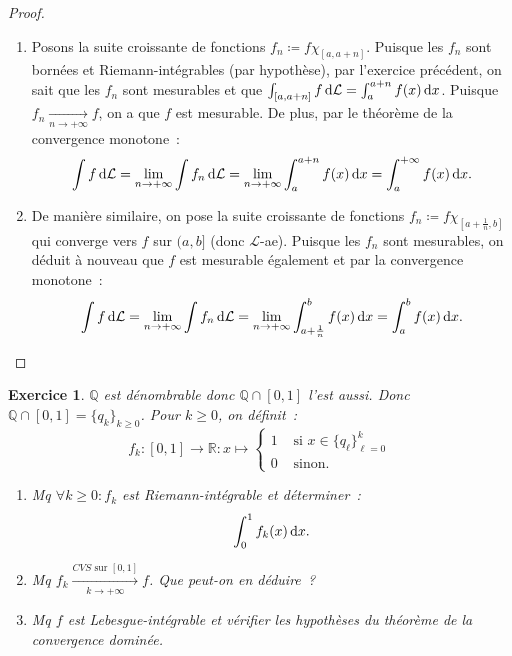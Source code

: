 \documentclass{article}
\newtheorem{ex}{Exercice}[section]
\newcommand{\pinfty}{{+\infty}}
\newcommand{\Q}{{\mathbb Q}}
\newcommand{\R}{{\mathbb R}}
\begin{document}
\begin{proof}~
\begin{enumerate}
	\item Posons la suite croissante de fonctions $f_n \coloneqq f\chi_{[a, a+n]}$. Puisque les $f_n$ sont bornées et Riemann-intégrables (par hypothèse), par l'exercice précédent,
	on sait que les $f_n$ sont mesurables et que $\int_{[a, a+n]}f\dif\mathcal L = \int_a^{a+n}f(x)\dif x$. Puisque $f_n \xrightarrow[n \to \pinfty]{} f$, on
	a que $f$ est mesurable. De plus, par le théorème de la convergence monotone~:
	\[\int f\dif\mathcal L = \lim_{n \to \pinfty}\int f_n\dif\mathcal L = \lim_{n \to \pinfty}\int_a^{a+n}f(x)\dif x = \int_a^\pinfty f(x)\dif x.\]

	\item De manière similaire, on pose la suite croissante de fonctions $f_n \coloneqq f\chi_{[a+\frac 1n, b]}$ qui converge vers $f$ sur $(a, b]$ (donc $\mathcal L$-ae).
	Puisque les $f_n$ sont mesurables, on déduit à nouveau que $f$ est mesurable également et par la convergence monotone~:
	\[\int f\dif\mathcal L = \lim_{n \to \pinfty}\int f_n\dif\mathcal L = \lim_{n \to \pinfty}\int_{a+\frac 1n}^bf(x)\dif x = \int_a^bf(x)\dif x.\]
\end{enumerate}
\end{proof}

\begin{ex} $\Q$ est dénombrable donc $\Q \cap [0, 1]$ l'est aussi. Donc $\Q \cap [0, 1] = \{q_k\}_{k \geq 0}$. Pour $k \geq 0$, on définit~:
\[f_k : [0, 1] \to \R : x \mapsto \begin{cases}1 &\text{ si } x \in \{q_\ell\}_{\ell=0}^k \\0 &\text{ sinon}.\end{cases}\]

\begin{enumerate}
	\item Mq $\forall k \geq 0 : f_k$ est Riemann-intégrable et déterminer~:
	\[\int_0^1f_k(x)\dif x.\]
	\item Mq $f_k \xrightarrow[k \to \pinfty]{CVS \text{ sur } [0, 1]} f$. Que peut-on en déduire~?
	\item Mq $f$ est Lebesgue-intégrable et vérifier les hypothèses du théorème de la convergence dominée.
\end{enumerate}
\end{ex}
\end{document}
